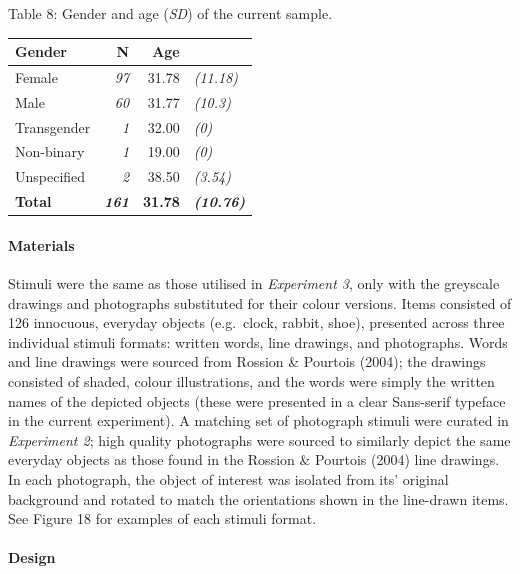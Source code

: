 \documentclass[
  11pt,
]{article}
\begin{document}
Table 8: Gender and age (\emph{SD}) of the current sample.

\begin{table}[!h]
\centering
\begin{tabular}{l>{}rr>{}l}
\toprule
Gender & N & Age &  \\
\midrule
Female & \em{97} & 31.78 & \em{(11.18)}\\
Male & \em{60} & 31.77 & \em{(10.3)}\\
Transgender & \em{1} & 32.00 & \em{(0)}\\
Non-binary & \em{1} & 19.00 & \em{(0)}\\
Unspecified & \em{2} & 38.50 & \em{(3.54)}\\
\addlinespace
\textbf{Total} & \textbf{\em{161}} & \textbf{31.78} & \textbf{\em{(10.76)}}\\
\bottomrule
\end{tabular}
\end{table}

\hypertarget{materials-3}{%
\paragraph{Materials}\label{materials-3}}

Stimuli were the same as those utilised in \emph{Experiment 3}, only
with the greyscale drawings and photographs substituted for their colour
versions. Items consisted of 126 innocuous, everyday objects
(e.g.~clock, rabbit, shoe), presented across three individual stimuli
formats: written words, line drawings, and photographs. Words and line
drawings were sourced from Rossion \& Pourtois (2004); the drawings
consisted of shaded, colour illustrations, and the words were simply the
written names of the depicted objects (these were presented in a clear
Sans-serif typeface in the current experiment). A matching set of
photograph stimuli were curated in \emph{Experiment 2}; high quality
photographs were sourced to similarly depict the same everyday objects
as those found in the Rossion \& Pourtois (2004) line drawings. In each
photograph, the object of interest was isolated from its' original
background and rotated to match the orientations shown in the line-drawn
items. See Figure 18 for examples of each stimuli format.

\hypertarget{design-3}{%
\paragraph{Design}\label{design-3}}
\end{document}
